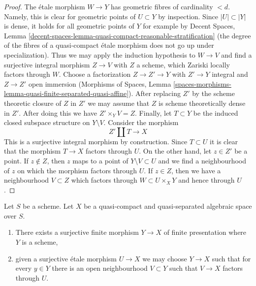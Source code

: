 \begin{proof}
\medskip\noindent
The \'etale morphism $W \to Y$ has geometric fibres of cardinality $< d$.
Namely, this is clear for geometric points of $U \subset Y$ by inspection.
Since $|U| \subset |Y|$ is dense, it holds for all geometric points of $Y$
for example by Decent Spaces, Lemma
\ref{decent-spaces-lemma-quasi-compact-reasonable-stratification}
(the degree of the fibres of a quasi-compact \'etale morphism
does not go up under specialization). Thus we may apply the induction
hypothesis to $W \to V$ and find a surjective integral morphism
$Z \to V$ with $Z$ a scheme, which Zariski locally factors through $W$.
Choose a factorization $Z \to Z' \to Y$ with $Z' \to Y$ integral and
$Z \to Z'$ open immersion
(Morphisms of Spaces, Lemma
\ref{spaces-morphisms-lemma-quasi-finite-separated-quasi-affine}).
After replacing $Z'$ by the scheme theoretic closure of $Z$ in $Z'$
we may assume that $Z$ is scheme theoretically dense in $Z'$.
After doing this we have $Z' \times_Y V = Z$. Finally,
let $T \subset Y$ be the induced closed subspace structure on $Y \setminus V$.
Consider the morphism
$$
Z' \amalg T \longrightarrow X
$$
This is a surjective integral morphism by construction.
Since $T \subset U$ it is clear that the morphism $T \to X$
factors through $U$. On the other hand, let $z \in Z'$
be a point. If $z \not \in Z$, then $z$ maps to a point of
$Y \setminus V \subset U$ and we find a neighbourhood of $z$
on which the morphism factors through $U$.
If $z \in Z$, then we have a neighbourhood $V \subset Z$
which factors through $W \subset U \times_X Y$ and hence through $U$.
\end{proof}

\begin{proposition}
\label{proposition-there-is-a-scheme-finite-over}
Let $S$ be a scheme. Let $X$ be a quasi-compact and quasi-separated
algebraic space over $S$.
\begin{enumerate}
\item There exists a surjective finite morphism $Y \to X$
of finite presentation where $Y$ is a scheme,
\item given a surjective \'etale morphism $U \to X$ we may choose
$Y \to X$ such that for every $y \in Y$ there is an open neighbourhood
$V \subset Y$ such that $V \to X$ factors through $U$.
\end{enumerate}
\end{proposition}

